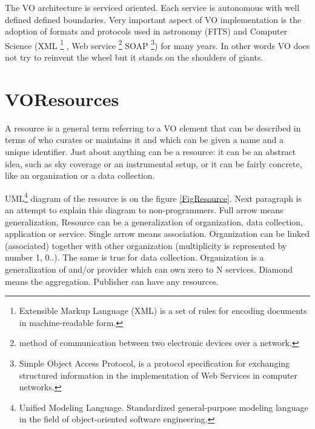 \clearpage

The VO architecture is serviced oriented. Each service is autonomous
with well defined defined boundaries. Very important aspect of VO
implementation is the adoption of formats and protocols used in
astronomy (FITS) and Computer Science (XML \footnote{Extensible
  Markup Language (XML) is a set of rules for encoding documents in
  machine-readable form.} , Web service \footnote{method of
  communication between two electronic devices over a network.} SOAP
\footnote{Simple Object Access Protocol, is a protocol specification
  for exchanging structured information in the implementation of Web
  Services in computer networks.}) for many years. In other words VO
does not try to reinvent the wheel but it stands on the shoulders of
giants.


\section{VOResources}

A resource is a general term referring to a VO element that can be
described in terms of who curates or maintains it and which can be
given a name and a unique identifier. Just about anything can be a
resource: it can be an abstract idea, such as sky coverage or an
instrumental setup, or it can be fairly concrete, like an organization
or a data collection. \cite{bensonivoa}

UML\footnote{Unified Modeling Language. Standardized general-purpose
  modeling language in the field of object-oriented software
  engineering.}  diagram of the resource is on the figure
\ref{FigResource}. Next paragraph is an attempt to explain this
diagram to non-programmers. Full arrow means generalization, Resource
can be a generalization of organization, data collection, application
or service. Single arrow means association. Organization can be linked
(associated) together with other organization (multiplicity is
represented by number 1, 0..). The same is true for data
collection. Organization is a generalization of and/or provider which
can own zero to N services. Diamond means the aggregation. Publisher
can have any resources.
  
